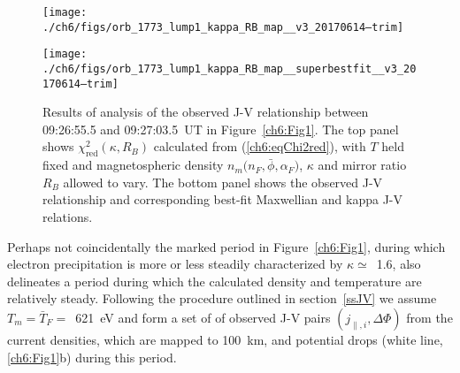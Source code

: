 
  \begin{figure}
    \centering

    \noindent\texttt{[image: ./ch6/figs/orb\_1773\_lump1\_kappa\_RB\_map\_\_v3\_20170614--trim]}

    \vspace{1cm}

    \noindent\texttt{[image: ./ch6/figs/orb\_1773\_lump1\_kappa\_RB\_map\_\_superbestfit\_\_v3\_20170614--trim]}

    \caption[Orbit 1773: Reduced chi-squared values for observed J-V
    relationship with $T$ held fixed and magnetospheric density
    $n_m \big ( n_F, \bar{\phi}, \alpha_F \big )$ $\kappa$ and $R_B$ allowed to
    vary, and corresponding best-fit J-V curves.]{Results of analysis of the
      observed J-V relationship between 09:26:55.5 and 09:27:03.5~UT in
      Figure~\ref{ch6:Fig1}. The top panel shows
      $\chi^2_{\mathrm{red}} ( \kappa, R_B)$ calculated from
      (\ref{ch6:eqChi2red}), with $T$ held fixed and magnetospheric density
      $n_m \big ( n_F, \bar{\phi}, \alpha_F \big )$, $\kappa$ and mirror ratio
      $R_B$ allowed to vary. The bottom panel shows the observed J-V
      relationship and corresponding best-fit Maxwellian and kappa J-V
      relations.}
    \label{ch6:Fig3}
  \end{figure}


  Perhaps not coincidentally the marked period in Figure~\ref{ch6:Fig1}, during
  which electron precipitation is more or less steadily characterized by
  $\kappa \simeq$~1.6, also delineates a period during which the calculated
  density and temperature are relatively steady. Following the procedure
  outlined in section~\ref{ssJV} we assume $T_m = \bar{T}_F =$~621~eV and form a
  set of of observed J-V pairs $( j_{\parallel,i} , \Delta \Phi )$ from the
  current densities, which are mapped to 100~km, and potential drops (white
  line, \ref{ch6:Fig1}b) during this period.

